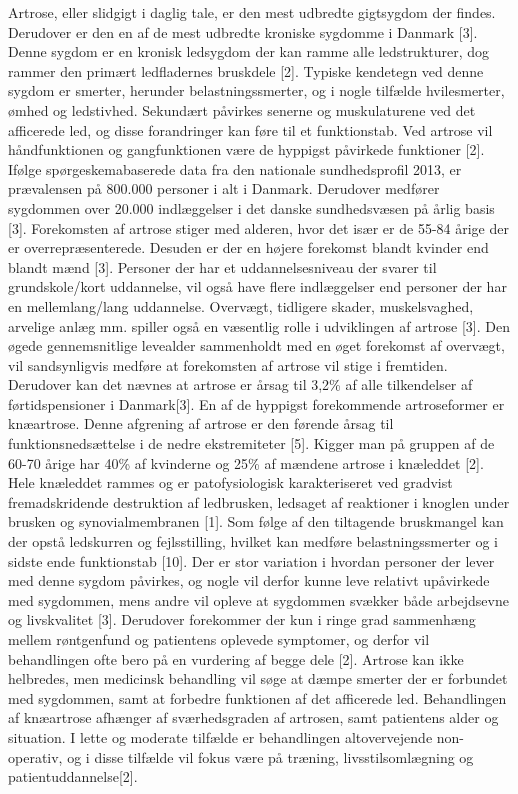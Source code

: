 Artrose, eller slidgigt i daglig tale, er den mest udbredte gigtsygdom der findes. Derudover er den en af de mest udbredte kroniske sygdomme i Danmark [3]. Denne sygdom er en kronisk ledsygdom der kan ramme alle ledstrukturer, dog rammer den primært ledfladernes bruskdele [2].
Typiske kendetegn ved denne sygdom er smerter, herunder belastningssmerter, og i nogle tilfælde hvilesmerter, ømhed og ledstivhed. Sekundært påvirkes senerne og muskulaturene ved det afficerede led, og disse forandringer kan føre til et funktionstab. Ved artrose vil håndfunktionen og gangfunktionen være de hyppigst påvirkede funktioner [2]. 
Ifølge spørgeskemabaserede data fra den nationale sundhedsprofil 2013, er prævalensen på 800.000 personer i alt i Danmark. Derudover medfører sygdommen  over 20.000 indlæggelser i det danske sundhedsvæsen på årlig basis [3]. Forekomsten af artrose stiger med alderen, hvor det især er de 55-84 årige der er overrepræsenterede. Desuden er der en højere forekomst blandt kvinder end blandt mænd [3]. 
Personer der har et uddannelsesniveau der svarer til grundskole/kort uddannelse, vil også have flere indlæggelser end personer der har en mellemlang/lang uddannelse. Overvægt, tidligere skader, muskelsvaghed, arvelige anlæg mm. spiller også en væsentlig rolle i udviklingen af artrose [3]. Den øgede gennemsnitlige levealder sammenholdt med en øget forekomst af overvægt, vil sandsynligvis medføre at  forekomsten af artrose vil stige i fremtiden. Derudover kan det nævnes at artrose er årsag til 3,2\% af alle tilkendelser af førtidspensioner i Danmark[3].
En af de hyppigst forekommende artroseformer er knæartrose. Denne afgrening af artrose er den førende årsag til funktionsnedsættelse i de nedre ekstremiteter [5]. Kigger man på gruppen af de 60-70 årige har 40\% af kvinderne og 25\% af mændene artrose i knæleddet [2].
Hele knæleddet rammes og er patofysiologisk karakteriseret ved gradvist fremadskridende destruktion af ledbrusken, ledsaget af reaktioner i knoglen under brusken og synovialmembranen [1]. Som følge af den tiltagende bruskmangel kan der opstå ledskurren og fejlsstilling, hvilket kan medføre belastningssmerter og i sidste ende funktionstab [10].  
Der er stor variation i hvordan personer der lever med denne sygdom påvirkes, og nogle vil derfor kunne leve relativt upåvirkede med sygdommen, mens andre vil opleve at sygdommen svækker både arbejdsevne og livskvalitet [3]. Derudover forekommer der kun i ringe grad sammenhæng mellem røntgenfund og patientens oplevede symptomer, og derfor vil behandlingen ofte bero på en vurdering af begge dele [2].
Artrose kan ikke helbredes, men medicinsk behandling vil søge at dæmpe smerter der er forbundet med sygdommen, samt at forbedre funktionen af det afficerede led. Behandlingen af knæartrose afhænger af sværhedsgraden af artrosen, samt patientens alder og situation. I lette og moderate tilfælde er behandlingen altovervejende non-operativ, og i disse tilfælde vil fokus være på træning, livsstilsomlægning og patientuddannelse[2].

